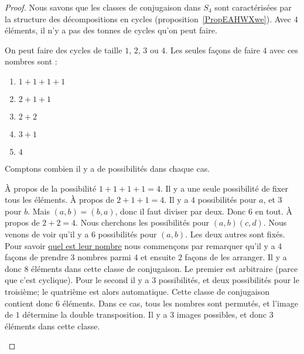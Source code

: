 \begin{proof}
	Nous savons que les classes de conjugaison dans \( S_4\) sont caractérisées par la structure des décompositions en cycles (proposition~\ref{PropEAHWXwe}). Avec \( 4\) éléments, il n'y a pas des tonnes de cycles qu'on peut faire.

	On peut faire des cycles de taille \( 1\), \( 2\), \( 3\) ou \( 4\). Les seules façons de faire \( 4\) avec ces nombres sont :
	\begin{enumerate}
		\item
		      \( 1+1+1+1\)
		\item
		      \( 2+1+1\)
		\item
		      \( 2+2\)
		\item
		      \( 3+1\)
		\item
		      \( 4\)
	\end{enumerate}
	Comptons combien il y a de possibilités dans chaque cas.
	\begin{subproof}
		À propos de la possibilité \( 1+1+1+1=4\). Il y a une seule possibilité de fixer tous les éléments.
		À propos de \( 2+1+1=4\). Il y a \( 4\) possibilités pour \( a\), et \( 3 \) pour \( b\). Mais \( (a,b)=(b,a)\), donc il faut diviser par deux. Donc \( 6\) en tout.
		À propos de \( 2+2=4\). Nous cherchons les possibilités pour  \( (a,b)(c,d)\). Nous venons de voir qu'il y a \( 6\) possibilités pour \( (a,b)\). Les deux autres sont fixés.
		Pour savoir \href{http://www.toujourspret.com/techniques/expression/chants/C/cantique_des_etoiles.php}{quel est leur nombre} nous commençons par remarquer qu'il y a \( 4\) façons de prendre \( 3\) nombres parmi \( 4\) et ensuite \( 2\) façons de les arranger. Il y a donc \( 8\) éléments dans cette classe de conjugaison.
		Le premier est arbitraire (parce que c'est cyclique). Pour le second il y a \( 3\) possibilités, et deux possibilités pour le troisième; le quatrième est alors automatique. Cette classe de conjugaison contient donc \( 6\) éléments.
		Dans ce cas, tous les nombres sont permutés, et l'image de \( 1\) détermine la double transposition. Il y a \( 3\) images possibles, et donc \( 3\) éléments dans cette classe.
	\end{subproof}
\end{proof}

